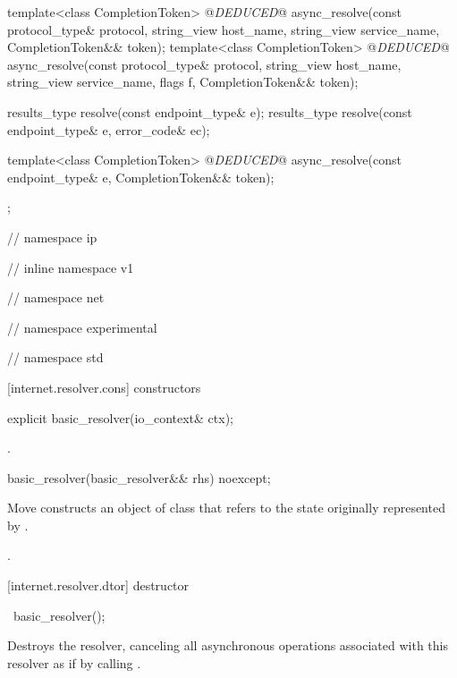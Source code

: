 \begin{codeblock}
{{{{{{    template<class CompletionToken>
      @\textit{DEDUCED}@ async_resolve(const protocol_type& protocol,
                            string_view host_name, string_view service_name,
                            CompletionToken&& token);
    template<class CompletionToken>
      @\textit{DEDUCED}@ async_resolve(const protocol_type& protocol,
                            string_view host_name, string_view service_name,
                            flags f, CompletionToken&& token);

    results_type resolve(const endpoint_type& e);
    results_type resolve(const endpoint_type& e, error_code& ec);

    template<class CompletionToken>
      @\textit{DEDUCED}@ async_resolve(const endpoint_type& e,
                            CompletionToken&& token);
  };

} // namespace ip
} // inline namespace v1
} // namespace net
} // namespace experimental
} // namespace std
\end{codeblock}


[internet.resolver.cons]{ constructors}

\begin{itemdecl}
explicit basic_resolver(io_context& ctx);
\end{itemdecl}

\begin{itemdescr}
\pnum
\postconditions {}.
\end{itemdescr}

\begin{itemdecl}
basic_resolver(basic_resolver&& rhs) noexcept;
\end{itemdecl}

\begin{itemdescr}
\pnum
\effects Move constructs an object of class  that refers to the state originally represented by .

\pnum
\postconditions {}.
\end{itemdescr}



[internet.resolver.dtor]{ destructor}

\begin{itemdecl}
~basic_resolver();
\end{itemdecl}

\begin{itemdescr}
\pnum
\effects Destroys the resolver, canceling all asynchronous operations associated with this resolver as if by calling .
\end{itemdescr}



